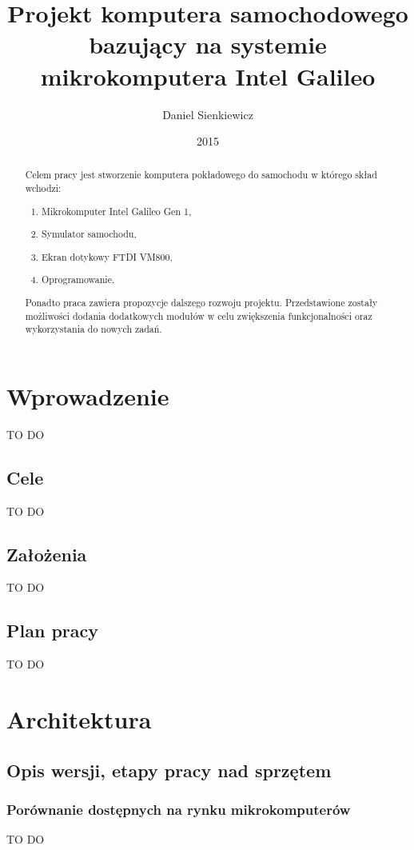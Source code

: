 \documentclass{xmgr}
\author   {Daniel Sienkiewicz}
\title    {Projekt komputera samochodowego bazujący na systemie mikrokomputera Intel Galileo}
\date     {2015}
\begin{document}
\begin{abstract}
Celem pracy jest stworzenie komputera pokładowego do samochodu w którego skład wchodzi: \begin{enumerate}
\item Mikrokomputer Intel Galileo Gen 1, 
\item Symulator samochodu, 
\item Ekran dotykowy FTDI VM800, 
\item Oprogramowanie.
\end{enumerate}

Ponadto praca zawiera propozycje dalszego rozwoju projektu. Przedstawione zostały możliwości dodania dodatkowych modułów w celu zwiększenia funkcjonalności oraz wykorzystania do nowych zadań.
\end{abstract}
\maketitle

\chapter{Wprowadzenie}
TO DO
\section{Cele}
TO DO
\section{Założenia}
TO DO
\section{Plan pracy}
TO DO

\chapter{Architektura}
\section{Opis wersji, etapy pracy nad sprzętem}
\subsection{Porównanie dostępnych na rynku mikrokomputerów}
TO DO
\end{document}
